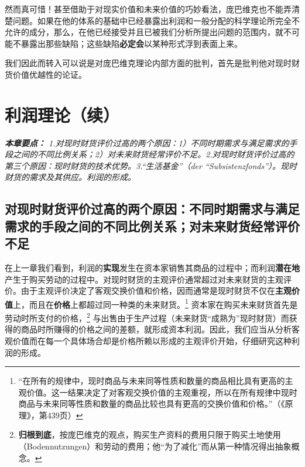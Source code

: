 \documentclass[fontset=fandol, a4paper, 12pt, openright]{ctexbook}
\renewenvironment{quote}
  {\list{}{\rightmargin\leftmargin}%
   \item\relax\small\itshape\color{darkgray}}
  {\endlist}
\begin{document}
然而真可惜！甚至借助于对现实价值和未来价值的巧妙看法，庞巴维克也不能弄清楚问题。如果在他的体系的基础中已经暴露出利润和一般分配的科学理论所完全不允许的成分，那么，在他已经接受并且已被我们分析所提出问题的范围内，就不可能不暴露出那些缺陷；这些缺陷\textbf{必定会}以某种形式浮到表面上来。

我们因此而转入可以说是对庞巴维克理论内部方面的批判，首先是批判他对现时财货价值优越性的论证。


\chapter{利润理论（续）}

\begin{quote}
\small
\textbf{本章要点：} 1.对现时财货评价过高的两个原因：1）不同时期需求与满足需求的手段之间的不同比例关系；2）对未来财货经常评价不足。2.对现时财货评价过高的第三个原因：现时财货的技术优势。3.“生活基金”（der ``Subsistenzfonds''）。现时财货的需求及其供应。利润的形成。
\end{quote}

\section{对现时财货评价过高的两个原因：不同时期需求与满足需求的手段之间的不同比例关系；对未来财货经常评价不足}

在上一章我们看到，利润的\textbf{实现}发生在资本家销售其商品的过程中；而利润\textbf{潜在地}产生于购买劳动的过程中。对现时财货的主观评价通常超过对未来财货的主观评价。由于主观评价决定了客观交换价值和价格，因而通常是现时财货不仅在\textbf{主观价值}上，而且在\textbf{价格}上都超过同一种类的未来财货。\footnote{“在所有的规律中，现时商品与未来同等性质和数量的商品相比具有更高的主观价值。这一结果决定了对客观交换价值的主观重视，所以在所有规律中现时商品与未来同等性质和数量的商品比较也具有更高的交换价值和价格。”（《原理》，第439页）} 资本家在购买未来财货首先是劳动时所支付的价格，\footnote{\textbf{归根到底}，按庞巴维克的观点，购买生产资料的费用只限于购买土地使用（Bodennutzungen）和劳动的费用；他“为了减化”而从第一种情况得出抽象概念。} 与出售由于生产过程（未来财货“成熟为”现时财货）而获得的商品时所赚得的价格之间的差额，就形成资本利润。因此，我们应当从分析客观价值而在每一个具体场合却是价格所赖以形成的主观评价开始，仔细研究这种利润的形成。
\end{document}
